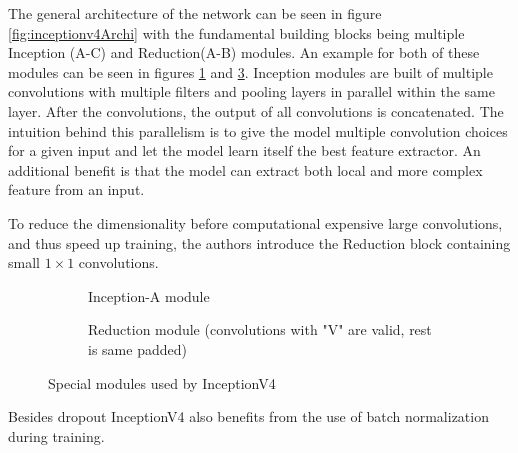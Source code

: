 The general architecture of the network can be seen in figure \ref{fig:inceptionv4Archi} with the fundamental building blocks being multiple Inception (A-C) and Reduction(A-B) modules. 
An example for both of these modules can be seen in figures \ref{fig:InceptionA} and \ref{fig:InceptionReduction}.
Inception modules are built of multiple convolutions with multiple filters and pooling layers in parallel within the same layer.
After the convolutions, the output of all convolutions is concatenated.
The intuition behind this parallelism is to give the model multiple convolution choices for a given input and let the model learn itself the best feature extractor. An additional benefit is that the model can extract both local and more complex feature from an input.

To reduce the dimensionality before computational expensive large convolutions, and thus speed up training, the authors introduce the Reduction block containing small $1\times1$ convolutions.   %




\begin{figure}[!htb]
\centering
\begin{subfigure}[b]{.95\textwidth}
\centering
   \resizebox{.8\linewidth}{!}{}
   \caption{Inception-A module}
   \label{fig:InceptionA} 
\end{subfigure}

\vspace{1em}
\begin{subfigure}[b]{.95\textwidth}
\centering
   \resizebox{.6\linewidth}{!}{}
   \caption{Reduction module (convolutions with "V" are valid, rest is same padded)}
   \label{fig:InceptionReduction}
\end{subfigure}

\caption{Special modules used by InceptionV4}

\end{figure}




Besides dropout InceptionV4 also benefits from the use of batch normalization during training.

